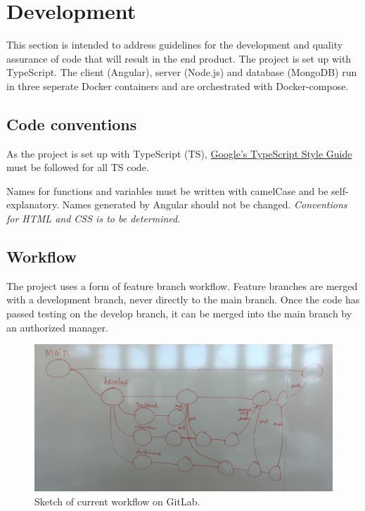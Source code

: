 \section{Development}
This section is intended to address guidelines for the development and quality assurance of code that will result in the end product. The project is set up with TypeScript. The client (Angular), server (Node.js) and database (MongoDB) run in three seperate Docker containers and are orchestrated with Docker-compose.

\subsection{Code conventions}
As the project is set up with TypeScript (TS), \href{https://google.github.io/styleguide/tsguide.html}{Google's TypeScript Style Guide} must be followed for all TS code.

Names for functions and variables must be written with camelCase and be self-explanatory. Names generated by Angular should not be changed. \emph{Conventions for HTML and CSS is to be determined}.

\subsection{Workflow}
The project uses a form of feature branch workflow. Feature branches are merged with a development branch, never directly to the main branch. Once the code has passed testing on the develop branch, it can be merged into the main branch by an authorized manager.

\begin{figure}[H]
    \centering\includegraphics[width=1\linewidth]{figures/workflow-sketch.jpg}
    \caption{Sketch of current workflow on GitLab.}
    \label{fig:workflow}
\end{figure}

